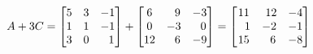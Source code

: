\documentclass[12pt]{amsart}
\begin{document}
\begin{enumerate}
		\begin{align}
			A+3C=
			\begin{bmatrix}
				5 &3 &-1 \\
				1 &1 &-1 \\
				3 &0 & \text{ } \text{ } 1
			\end{bmatrix} +
			\begin{bmatrix}
				6 &\text{ } \text{ }9 &-3 \\
				0 &-3 &\text{ } \text{ }0 \\
				12 &\text{ } \text{ }6 &-9
			\end{bmatrix} =
			\begin{bmatrix}
				11 &\text{ }12 &-4 \\
				\text{ } \text{ }1 &-2 &-1 \\
				15 &\text{ } \text{ }6 &-8
			\end{bmatrix} \notag
		\end{align}
		

\end{enumerate}
\end{document}
